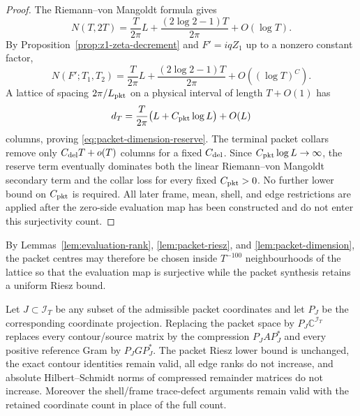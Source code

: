 \begin{proof}
The Riemann--von Mangoldt formula gives
\[
N(T,2T)=\frac{T}{2\pi}L
+\frac{(2\log2-1)T}{2\pi}+O(\log T).
\]
By Proposition~\ref{prop:z1-zeta-decrement} and $F'=iqZ_1$ up to a nonzero
constant factor,
\[
N(F';T_1,T_2)
=\frac{T}{2\pi}L
+\frac{(2\log2-1)T}{2\pi}+O((\log T)^C).
\]
A lattice of spacing $2\pi/L_{\rm pkt}$ on a physical interval of length
$T+O(1)$ has
\[
d_T=\frac{T}{2\pi}\bigl(L+C_{\rm pkt}\log L\bigr)+O(L)
\]
columns, proving \eqref{eq:packet-dimension-reserve}. The terminal packet
collars remove only $C_{\rm del}T+o(T)$ columns for a fixed $C_{\rm del}$.
Since $C_{\rm pkt}\log L\to\infty$, the reserve term eventually dominates both
the linear Riemann--von Mangoldt secondary term and the collar loss for every
fixed $C_{\rm pkt}>0$. No further lower bound on $C_{\rm pkt}$ is required.
All later frame, mean, shell, and edge restrictions are applied
after the zero-side evaluation map has been constructed and do not enter this
surjectivity count.
\end{proof}

By Lemmas~\ref{lem:evaluation-rank}, \ref{lem:packet-riesz}, and
\ref{lem:packet-dimension}, the packet centres may therefore be chosen inside
$T^{-100}$ neighbourhoods of the lattice so that the evaluation map is
surjective while the packet synthesis retains a uniform Riesz bound.

\begin{lemma}
\label{lem:coordinate-restriction}
Let $J\subset\mathcal I_T$ be any subset of the admissible packet coordinates
and let $P_J$ be the corresponding coordinate projection. Replacing the packet
space by $P_J\mathbb C^{\mathcal I_T}$ replaces every contour/source matrix by
the compression $P_JAP_J^*$ and every positive reference Gram by
$P_JGP_J^*$. The packet Riesz lower bound is unchanged, the exact contour
identities remain valid, all edge ranks do not increase, and absolute
Hilbert--Schmidt norms of compressed remainder matrices do not increase.
Moreover the shell/frame trace-defect arguments remain valid with the retained
coordinate count in place of the full count.
\end{lemma}

